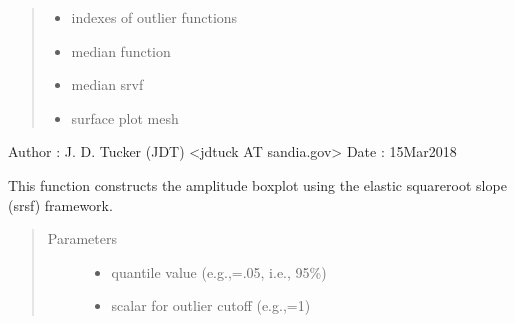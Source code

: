 \documentclass[letterpaper,10pt,english]{sphinxmanual}
\begin{document}
\begin{fulllineitems}
\begin{quote}
\begin{description}
\begin{itemize}
\item {} 
 \textendash{} indexes of outlier functions

\item {} 
 \textendash{} median function

\item {} 
 \textendash{} median srvf

\item {} 
 \textendash{} surface plot mesh

\end{itemize}

\end{description}\end{quote}

Author :  J. D. Tucker (JDT) \textless{}jdtuck AT sandia.gov\textgreater{}
Date   :  15\sphinxhyphen{}Mar\sphinxhyphen{}2018

\begin{fulllineitems}
\label{\detokenize{boxplots:boxplots.ampbox.construct_boxplot}}
This function constructs the amplitude boxplot using the elastic
square\sphinxhyphen{}root slope (srsf) framework.
\begin{quote}\begin{description}
\item[{Parameters}] \leavevmode\begin{itemize}
\item {} 
 \textendash{} quantile value (e.g.,=.05, i.e., 95\%)

\item {} 
 \textendash{} scalar for outlier cutoff (e.g.,=1)

\end{itemize}

\end{description}\end{quote}

\end{fulllineitems}


\end{fulllineitems}
\end{document}
